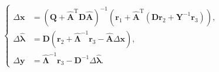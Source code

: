 \begin{equation}
    \begin{cases}
        \Delta \bm{x} &= \left( \mathbf{Q} + \hat{\mathbf{A}}^\mathrm{T}\mathbf{D}\hat{\mathbf{A}}\right)^{-1}\left( \bm{r}_1 + \hat{\mathbf{A}}^\mathrm{T}\left( \mathbf{D}\bm{r}_2 + \mathbf{Y}^{-1}\bm{r}_3 \right)\right),\\
        \Delta \hat{\bm{\lambda}} &= \mathbf{D}\left( \bm{r}_2 + \hat{\mathbf{\Lambda}}^{-1}\bm{r}_3 - \hat{\mathbf{A}}\Delta \bm{x} \right),\\
        \Delta \bm{y} &= \hat{\mathbf{\Lambda}}^{-1} \bm{r}_3 -  \mathbf{D}^{-1}\Delta \hat{\bm{\lambda}}.
    \end{cases}
    \tag{Sus}
    \label{Sec2_Ee_SUS}
\end{equation}
